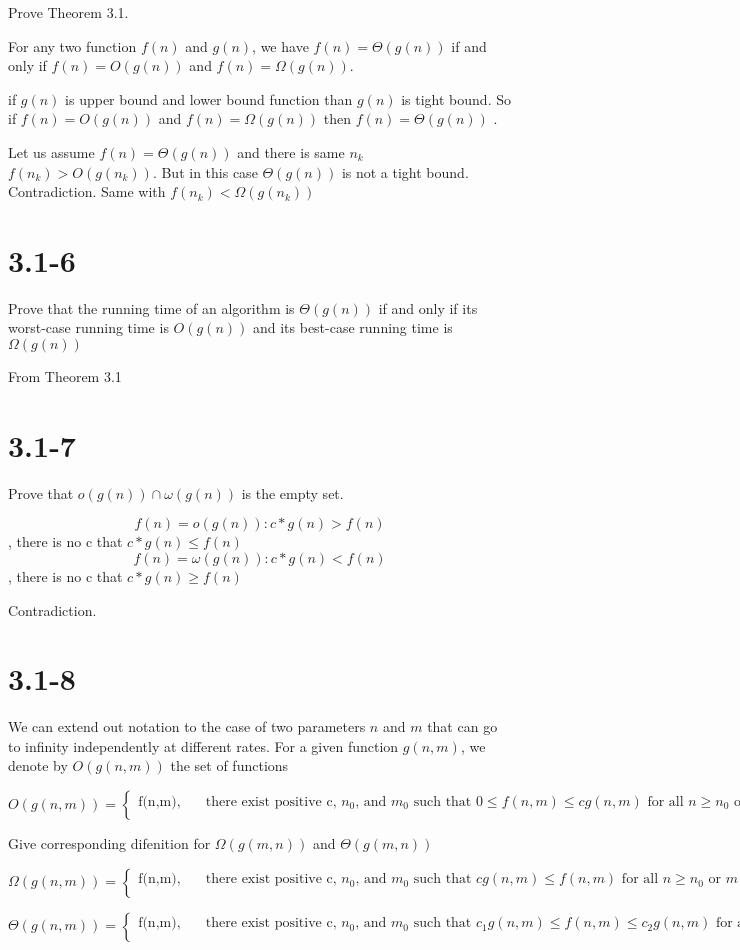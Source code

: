 \documentclass{article}
\begin{document}
Prove Theorem 3.1.

For any two function $f(n)$ and $g(n)$, we have $f(n)=\Theta(g(n))$ if and only if $f(n)=O(g(n))$ and $f(n)=\Omega(g(n))$.

if $g(n)$ is upper bound and lower bound function than $g(n)$ is tight bound. So if $f(n)=O(g(n))$ and $f(n)=\Omega(g(n))$ then $f(n)=\Theta(g(n))$ .

Let us assume $f(n)=\Theta(g(n))$ and there is same $n_k$ $f(n_k)>O(g(n_k))$. But in this case  $\Theta(g(n))$ is not a tight bound. Contradiction.
Same with $f(n_k)<\Omega(g(n_k))$

\section*{3.1-6}
Prove that the running time of an algorithm is $\Theta(g(n))$ if and only if its worst-case running time is  $O(g(n))$ and its best-case running time is  $\Omega(g(n))$

From Theorem 3.1

\section*{3.1-7}
Prove that $o(g(n)) \cap \omega(g(n))$ is the empty set.

\[ f(n) = o(g(n)) : c*g(n) >f(n) \] , there is no c that $c*g(n) \le f(n)$
\[ f(n) = \omega(g(n)) : c*g(n) < f(n) \], there is no c that $c*g(n) \ge f(n)$ 

Contradiction.

\section*{3.1-8}

We can extend out notation to the case of two parameters $n$ and $m$ that can go to infinity independently at different rates. For a given function $g(n,m)$, we denote by $O(g(n,m))$ the set of functions


\[ O(g(n,m)) = 
\begin{cases}
       \text{f(n,m),} &\quad\text{there exist positive c, $n_0$, and $m_0$ such that $0 \le f(n,m)  \le cg(n,m)$ for all $n \ge n_0$ or $m \ge m_0$}\\
     \end{cases}
\]

Give corresponding difenition for $\Omega(g(m,n))$ and  $\Theta(g(m,n))$ 

\[ \Omega(g(n,m)) = 
\begin{cases}
       \text{f(n,m),} &\quad\text{there exist positive c, $n_0$, and $m_0$ such that $cg(n,m) \le f(n,m) $ for all $n \ge n_0$ or $m \ge m_0$}\\
     \end{cases}
\]


\[ \Theta(g(n,m)) = 
\begin{cases}
       \text{f(n,m),} &\quad\text{there exist positive c, $n_0$, and $m_0$ such that $c_1g(n,m) \le f(n,m) \le c_2g(n,m) $ for all $n \ge n_0$ or $m \ge m_0$}\\
     \end{cases}
\]
\end{document}
